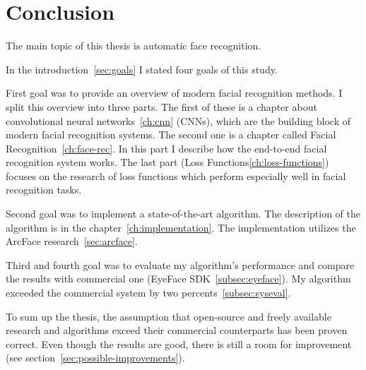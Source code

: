 \chapter{Conclusion}\label{ch:conclusion}
The main topic of this thesis is automatic face recognition.

In the introduction~\ref{sec:goals} I stated four goals of this study.

First goal was to provide an overview of modern facial recognition methods.
I split this overview into three parts.
The first of these is a chapter about convolutional neural networks~\ref{ch:cnn} (CNNs), which are the building
block of modern facial recognition systems.
The second one is a chapter called Facial Recognition~\ref{ch:face-rec}.
In this part I describe how the end-to-end facial recognition system works.
The last part (Loss Functions\ref{ch:loss-functions}) focuses on the research of loss functions which perform
especially well in facial recognition tasks.

Second goal was to implement a state-of-the-art algorithm.
The description of the algorithm is in the chapter~\ref{ch:implementation}.
The implementation utilizes the ArcFace research~\ref{sec:arcface}.

Third and fourth goal was to evaluate my algorithm's performance and compare the results with commercial one
(EyeFace SDK~\ref{subsec:eyeface}).
My algorithm exceeded the commercial system by two percents~\ref{subsec:syseval}.

To sum up the thesis, the assumption that open-source and freely available research and algorithms exceed
their commercial counterparts has been proven correct.
Even though the results are good, there is still a room for improvement (see section~\ref{sec:possible-improvements}).
\newpage

